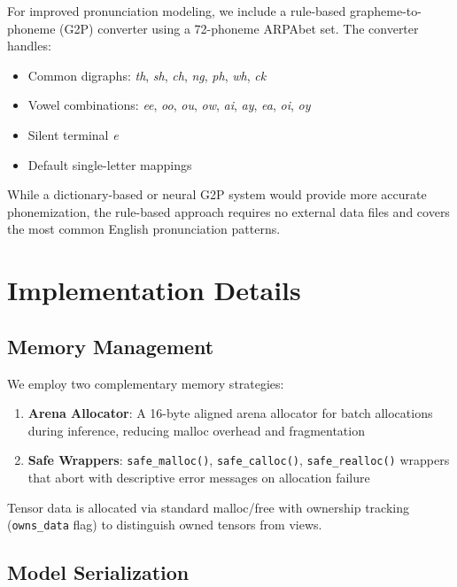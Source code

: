 \documentclass[conference]{IEEEtran}
\begin{document}
For improved pronunciation modeling, we include a rule-based grapheme-to-phoneme (G2P) converter using a 72-phoneme ARPAbet set. The converter handles:

\begin{itemize}
\item Common digraphs: \textit{th}, \textit{sh}, \textit{ch}, \textit{ng}, \textit{ph}, \textit{wh}, \textit{ck}
\item Vowel combinations: \textit{ee}, \textit{oo}, \textit{ou}, \textit{ow}, \textit{ai}, \textit{ay}, \textit{ea}, \textit{oi}, \textit{oy}
\item Silent terminal \textit{e}
\item Default single-letter mappings
\end{itemize}

While a dictionary-based or neural G2P system would provide more accurate phonemization, the rule-based approach requires no external data files and covers the most common English pronunciation patterns.

\section{Implementation Details}

\subsection{Memory Management}

We employ two complementary memory strategies:

\begin{enumerate}
\item \textbf{Arena Allocator}: A 16-byte aligned arena allocator for batch allocations during inference, reducing malloc overhead and fragmentation
\item \textbf{Safe Wrappers}: \texttt{safe\_malloc()}, \texttt{safe\_calloc()}, \texttt{safe\_realloc()} wrappers that abort with descriptive error messages on allocation failure
\end{enumerate}

Tensor data is allocated via standard malloc/free with ownership tracking (\texttt{owns\_data} flag) to distinguish owned tensors from views.

\subsection{Model Serialization}
\end{document}
